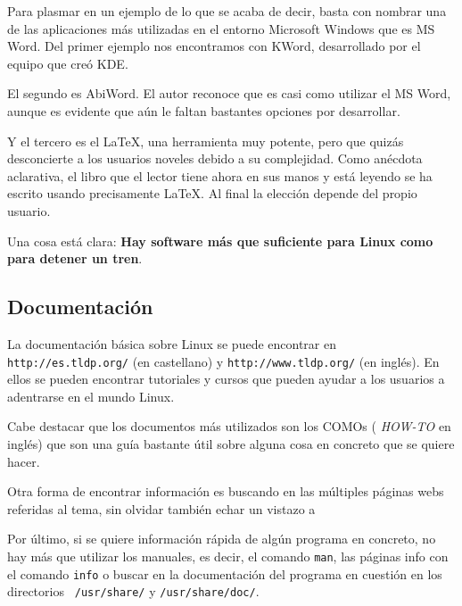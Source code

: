 Para plasmar  en un  ejemplo de lo  que se acaba  de decir,  basta con
nombrar una de las aplicaciones más utilizadas en el entorno Microsoft
Windows que es  {\sf MS Word}. Del primer ejemplo  nos encontramos con
{\sf KWord}, desarrollado por el equipo que creó {\sf KDE}.

El  segundo es  {\sf  AbiWord}. El  autor reconoce  que  es casi  como
utilizar  el {\sf  MS  Word}, aunque  es evidente  que  aún le  faltan
bastantes opciones por desarrollar.

Y  el tercero  es el  \LaTeX, una  herramienta muy  potente, pero  que
quizás desconcierte  a los usuarios  noveles debido a  su complejidad.
Como anécdota  aclarativa, el libro que  el lector tiene ahora  en sus
manos  y está  leyendo se  ha escrito  usando precisamente  \LaTeX. Al
final la elección depende del propio usuario.

Una cosa está  clara: {\bf Hay software más que  suficiente para Linux
como para detener un tren}.

\subsection{Documentación}

La  documentación  básica  sobre  Linux se  puede  encontrar  en  {\tt
http://es.tldp.org/} (en castellano)  y {\tt http://www.tldp.org/} (en
inglés). En ellos  se pueden encontrar tutoriales y  cursos que pueden
ayudar a los usuarios a adentrarse en el mundo Linux.

Cabe destacar  que los documentos  más utilizados son los  COMOs ({\em
HOW-TO} en inglés) que son una guía bastante útil sobre alguna cosa en
concreto que se quiere hacer.

Otra  forma de  encontrar  información es  buscando  en las  múltiples
páginas webs referidas al tema, sin olvidar también echar un vistazo a

Por  último, si  se quiere  información  rápida de  algún programa  en
concreto, no hay  más que utilizar los manuales, es  decir, el comando
{\tt man}, las páginas  info con el comando {\tt info}  o buscar en la
documentación  del  programa  en  cuestión  en  los  directorios  {\tt
/usr/share/} y {\tt /usr/share/doc/}.
